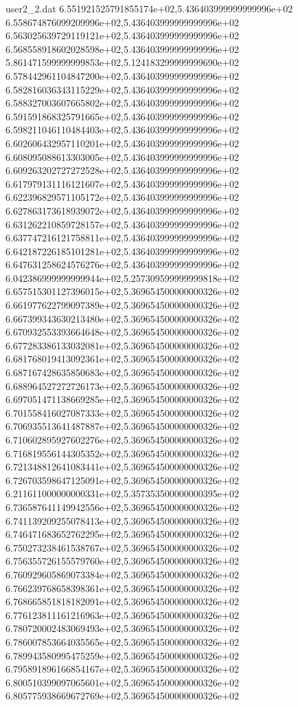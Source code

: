 \begin{filecontents}{user2_2.dat}
6.551921525791855174e+02,5.436403999999999996e+02
6.558674876099209996e+02,5.436403999999999996e+02
6.563025639729119121e+02,5.436403999999999996e+02
6.568558918602028598e+02,5.436403999999999996e+02
5.861471599999999853e+02,5.124183299999999690e+02
6.578442961104847200e+02,5.436403999999999996e+02
6.582816036343115229e+02,5.436403999999999996e+02
6.588327003607665802e+02,5.436403999999999996e+02
6.591591868325791665e+02,5.436403999999999996e+02
6.598211046110484403e+02,5.436403999999999996e+02
6.602606432957110201e+02,5.436403999999999996e+02
6.608095088613303005e+02,5.436403999999999996e+02
6.609263202727272528e+02,5.436403999999999996e+02
6.617979131116121607e+02,5.436403999999999996e+02
6.622396829571105172e+02,5.436403999999999996e+02
6.627863173618939072e+02,5.436403999999999996e+02
6.631262210859728157e+02,5.436403999999999996e+02
6.637747216121758811e+02,5.436403999999999996e+02
6.642187226185101281e+02,5.436403999999999996e+02
6.647631258624576276e+02,5.436403999999999996e+02
6.042386999999999944e+02,5.257309599999999818e+02
6.657515301127396015e+02,5.369654500000000326e+02
6.661977622799097389e+02,5.369654500000000326e+02
6.667399343630213480e+02,5.369654500000000326e+02
6.670932553393664648e+02,5.369654500000000326e+02
6.677283386133032081e+02,5.369654500000000326e+02
6.681768019413092361e+02,5.369654500000000326e+02
6.687167428635850683e+02,5.369654500000000326e+02
6.688964527272726173e+02,5.369654500000000326e+02
6.697051471138669285e+02,5.369654500000000326e+02
6.701558416027087333e+02,5.369654500000000326e+02
6.706935513641487887e+02,5.369654500000000326e+02
6.710602895927602276e+02,5.369654500000000326e+02
6.716819556144305352e+02,5.369654500000000326e+02
6.721348812641083441e+02,5.369654500000000326e+02
6.726703598647125091e+02,5.369654500000000326e+02
6.211611000000000331e+02,5.357353500000000395e+02
6.736587641149942556e+02,5.369654500000000326e+02
6.741139209255078413e+02,5.369654500000000326e+02
6.746471683652762295e+02,5.369654500000000326e+02
6.750273238461538767e+02,5.369654500000000326e+02
6.756355726155579760e+02,5.369654500000000326e+02
6.760929605869073384e+02,5.369654500000000326e+02
6.766239768658398361e+02,5.369654500000000326e+02
6.768665851818182091e+02,5.369654500000000326e+02
6.776123811161216963e+02,5.369654500000000326e+02
6.780720002483069493e+02,5.369654500000000326e+02
6.786007853664035565e+02,5.369654500000000326e+02
6.789943580995475259e+02,5.369654500000000326e+02
6.795891896166854167e+02,5.369654500000000326e+02
6.800510399097065601e+02,5.369654500000000326e+02
6.805775938669672769e+02,5.369654500000000326e+02

\end{filecontents}
